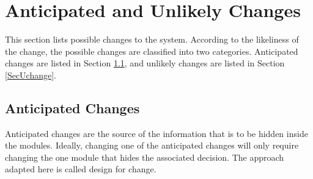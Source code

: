 \documentclass[12pt, titlepage]{article}
\begin{document}
\newpage

\section{Anticipated and Unlikely Changes} 
\label{SecChange}
This section lists possible changes to the system. According to the likeliness
of the change, the possible changes are classified into two
categories. Anticipated changes are listed in Section \ref{SecAchange}, and
unlikely changes are listed in Section \ref{SecUchange}.

\subsection{Anticipated Changes} 
\label{SecAchange}
Anticipated changes are the source of the information that is to be hidden
inside the modules. Ideally, changing one of the anticipated changes will only
require changing the one module that hides the associated decision. The approach
adapted here is called design for change.
\end{document}
